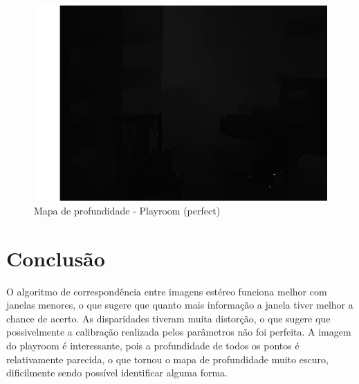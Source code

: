 \documentclass{bmvc2k}
\begin{document}
\begin{figure}[htbp]
            \centering
            \includegraphics[scale=0.25]{Figs/profundidade1.png}
            \caption{Mapa de profundidade - Playroom (perfect)}
            \label{1}
        \end{figure}

\newpage

        
\section{Conclusão}

O algoritmo de correspondência entre imagens estéreo funciona melhor com janelas menores, o que sugere que quanto mais informa\c{c}ão a janela tiver melhor a chance de acerto. As disparidades tiveram muita distor\c{c}ão, o que sugere que possivelmente a calibra\c{c}ão realizada pelos parâmetros não foi perfeita. A imagem do playroom é interessante, pois a profundidade de todos os pontos é relativamente parecida, o que tornou o mapa de profundidade muito escuro, dificilmente sendo possível identificar alguma forma.



\end{document}

